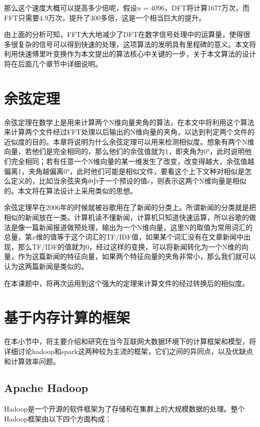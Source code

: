 那么这个速度大概可以提高多少倍呢，假设$n=4096$，DFT将计算1677万次，而FFT只需要4.9万次，提升了300多倍，这是一个相当巨大的提升。

由上面的分析可知，FFT大大地减少了DFT在数字信号处理中的运算量，使得很多很复杂的信号可以得到快速的处理，这项算法的发明具有里程碑的意义。本文将利用快速傅里叶变换作为本文提出的算法核心中关键的一步，关于本文算法的设计将在后面几个章节中详细说明。

\section{余弦定理}
\label{sec:cosin}

余弦定理在数学上是用来计算两个N维向量夹角的算法，在本文中将利用这个算法来计算两个文件经过FFT处理以后输出的N维向量的夹角，以达到判定两个文件的近似度的目的。本章将说明为什么余弦定理可以用来检测相似度。想象有两个N维向量，若他们是完全相同的，那么他们的余弦值就为1，即夹角为0°，此时说明他们完全相同；若有任意一个N维向量的某一维发生了改变，改变得越大，余弦值越偏离1，夹角越偏离0°，此时他们可能是相似文件，要看这个上下文种对相似是怎么定义的，比如当余弦夹角$\theta$小于一个预设的值$\epsilon$，则表示这两个N维向量是相似的。本文将在算法设计上采用类似的思想。

余弦定理早在2006年的时候就被谷歌用在了新闻的分类上。所谓新闻的分类就是把相似的新闻放在一类。计算机读不懂新闻，计算机只知道快速运算，所以谷歌的做法是像一篇新闻报道做预处理，输出为一个N维向量，这里N的取值为常用词汇的总量，第$x$维的值等于这个词汇的TF/IDF值，如果某个词汇没有在文章新闻中出现，那么TF/IDF的值就为0，经过这样的变换，可以将新闻转化为一个N维的向量，作为这篇新闻的特征向量，如果两个特征向量的夹角非常小，那么我们就可以认为这两篇新闻是类似的。

在本课题中，将再次运用到这个强大的定理来计算文件的经过转换后的相似度。

\section{基于内存计算的框架}
\label{sec:framework}
在本小节中，将主要介绍和研究在当今互联网大数据环境下的计算框架和模型，将详细讨论hadoop和spark这两种较为主流的框架，它们之间的异同点，以及优缺点和计算效率问题。

\subsection{Apache Hadoop}
Hadoop是一个开源的软件框架为了存储和在集群上的大规模数据的处理。整个Hadoop框架由以下四个方面构成：

